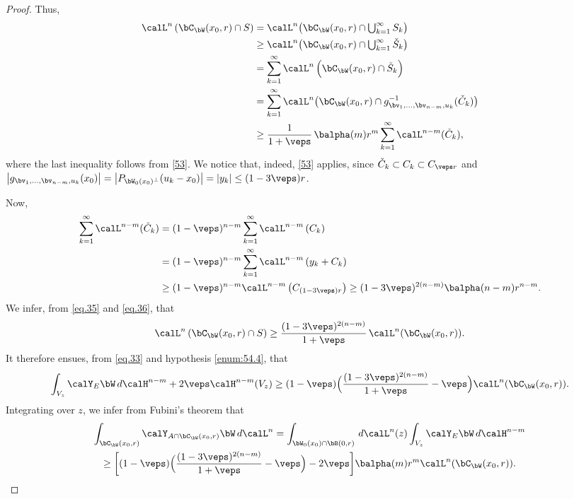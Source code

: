 \begin{proof}
Thus,
\begin{equation}
\label{eq.35}
\begin{split}
\calL^n \left(\bC_\bW(x_0,r) \cap S\right) & =\calL^n \bigl(\bC_\bW(x_0,r) \cap \textstyle\bigcup_{k=1}^\infty S_k\bigr) \\
& \geq \calL^n \bigl(\bC_\bW(x_0,r) \cap \textstyle\bigcup_{k=1}^\infty \check{S}_k\bigr) \\
& = \sum_{k=1}^\infty \calL^n \left(\bC_\bW(x_0,r) \cap \check{S}_k\right) \\
& = \sum_{k=1}^\infty \calL^n \bigl(\bC_\bW(x_0,r) \cap g_{\bv_1,\ldots,\bv_{n-m},u_k}^{-1}(\check{C}_k) \bigr) \\
& \geq \frac{1}{1+\veps}\,\balpha(m)r^m \sum_{k=1}^\infty \calL^{n-m}(\check{C}_k),
\end{split}
\end{equation}
where the last inequality follows from \ref{53}.
We notice that, indeed, \ref{53} applies, since $\check{C}_k \subset C_k \subset C_{\veps r}$ and $\left|g_{\bv_1,\ldots,\bv_{n-m},u_k}(x_0)\right| = \left| P_{\bW_0(x_0)^\perp}(u_k-x_0) \right| = \left| y_k\right| \leq (1-3\veps)r$.
\par
Now,
\begin{align}
\sum_{k=1}^\infty \calL^{n-m} (\check{C}_k) &= (1-\veps)^{n-m} \sum_{k=1}^\infty \calL^{n-m} \left(C_k \right)\notag\\
&= (1-\veps)^{n-m} \sum_{k=1}^\infty \calL^{n-m} \left(y_k + C_k \right)\label{eq.36} \\
&\geq (1-\veps)^{n-m} \calL^{n-m} \left(C_{(1-3\veps)r} \right) \geq (1-3\veps)^{2(n-m)} \balpha(n-m)r^{n-m}.\notag
\end{align}
We infer, from \eqref{eq.35} and \eqref{eq.36}, that
\begin{equation*}
\calL^n \left(\bC_\bW(x_0,r) \cap S\right) \geq \frac{(1-3\veps)^{2(n-m)}}{1+\veps}\,\calL^n (\bC_\bW(x_0,r)).
\end{equation*}
It therefore ensues, from \eqref{eq.33} and hypothesis \eqref{enum:54.4}, that
\begin{equation*}
\int_{V_z} \calY_E \bW \,d\calH^{n-m} +2\veps \calH^{n-m}(V_z) \geq (1-\veps)\Bigl(\frac{(1-3\veps)^{2(n-m)}}{1+\veps} - \veps \Bigr)\calL^n(\bC_\bW(x_0,r)).
\end{equation*}
Integrating over $z$, we infer from Fubini's theorem that
\begin{multline*}
\int_{\bC_\bW(x_0,r)} \calY_{A \cap \bC_\bW(x_0,r)} \bW \,d\calL^n = \int_{\bW_0(x_0) \cap \bB(0,r)} \,d\calL^n(z) \int_{V_z} \calY_E \bW \,d\calH^{n-m} \\
\geq \biggl[ (1-\veps)\Bigl(\frac{(1-3\veps)^{2(n-m)}}{1+\veps}-\veps\Bigr)-2\veps\biggr]\balpha(m)r^m\calL^n(\bC_\bW(x_0,r)).\qedhere
\end{multline*}
\end{proof}

